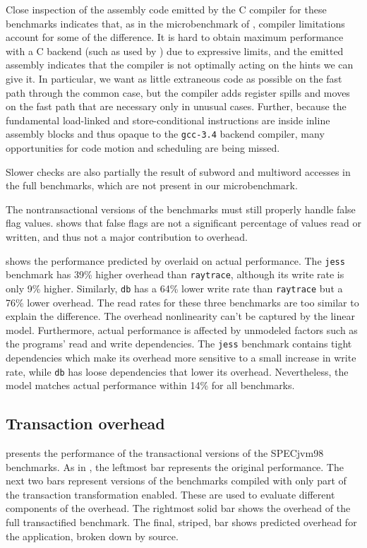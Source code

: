 Close inspection of the assembly code emitted by the C compiler for
these benchmarks indicates that, as in the microbenchmark of
, compiler limitations account for some of the
difference. It is hard to
obtain maximum performance with a C backend (such as used by \flex)
due to expressive limits, and the emitted assembly
indicates that the compiler is not optimally acting on the hints we
can give it.  In particular, we want as little extraneous code as
possible on the fast path through the common case, but the compiler
adds register spills and moves on the fast path that are necessary only in
unusual cases.  Further, because the fundamental load-linked and
store-conditional instructions are inside inline assembly blocks and
thus opaque to the \texttt{gcc-3.4} backend compiler, many
opportunities for code motion and scheduling are being missed.

Slower checks are also partially the result of
subword and multiword accesses in the
full benchmarks, which are not present in our microbenchmark.

The nontransactional versions of the benchmarks must still properly
handle false flag values.   shows that false flags
are not a significant percentage of values read or written, and thus
not a major contribution to overhead.

 shows the performance predicted by 
overlaid on actual performance.  The
\texttt{jess} benchmark has 39\% higher overhead than
\texttt{raytrace}, although
its write rate is only 9\% higher. Similarly, \texttt{db} has a 64\%
lower write rate than \texttt{raytrace} but a 76\% lower overhead.
The read rates for these three benchmarks are too similar to explain
the difference.  The overhead nonlinearity can't be captured by the
linear model.  Furthermore, actual
performance is affected by unmodeled factors such as the programs'
read and write dependencies. 
The \texttt{jess} benchmark contains tight dependencies which make its
overhead more sensitive to a small increase in write rate, while
\texttt{db} has loose dependencies that lower its overhead.
Nevertheless, the model
matches actual performance within 14\% for all benchmarks.

\subsection{Transaction overhead}

 presents the performance of the transactional
versions of the SPECjvm98 benchmarks.  As in
, the leftmost bar represents the
original performance.  The next two bars represent versions of the
benchmarks compiled with only part of the transaction transformation
enabled.  These are used to evaluate different components of the
overhead.  The rightmost solid bar shows the overhead of the full
transactified benchmark.  The final, striped, bar shows predicted overhead for
the application, broken down by source.

